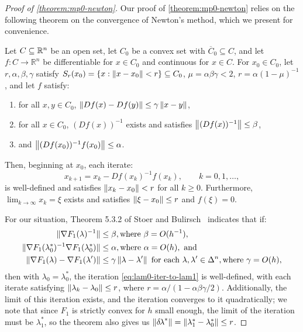\documentclass{article}
\begin{document}
\begin{proof}[Proof of \cref{theorem:mp0-newton}]
  Our proof of \cref{theorem:mp0-newton} relies on the following
  theorem on the convergence of Newton's method, which we present for
  convenience.

  \begin{theorem}\label{thm:stoer-bulirsch}
    Let $C \subseteq \mathbb{R}^n$ be an open set, let $C_0$ be a convex set
    with $\overline{C}_0 \subseteq C$, and let
    $f : C \to \mathbb{R}^n$ be differentiable for $x \in C_0$ and
    continuous for $x \in C$. For $x_0 \in C_0$, let
    $r, \alpha, \beta, \gamma$ satisfy
    $S_r(x_0) = \left\{x : \left\|x - x_0\right\| < r\right\} \subseteq C_0$,
    $\mu = \alpha\beta\gamma < 2$, $r = \alpha(1 - \mu)^{-1}$, and let
    $f$ satisfy:
    \begin{enumerate}[label=(\alph*)]
    \item for all $x, y \in C_0$,
      $\left\|D f(x) - D f(y)\right\| \leq \gamma \left\|x - y\right\|$,
    \item for all $x \in C_0$, $(D f(x))^{-1}$ exists and satisfies
      $\left\|(Df(x))^{-1}\right\| \leq \beta$,
    \item and $\left\|(Df(x_0))^{-1} f(x_0)\right\| \leq \alpha$.
    \end{enumerate}
    Then, beginning at $x_0$, each iterate:
    \begin{equation}
      x_{k+1} = x_k - Df(x_k)^{-1} f(x_k), \qquad k = 0, 1, \hdots,
    \end{equation}
    is well-defined and satisfies $\left\|x_k - x_0\right\| < r$ for all
    $k \geq 0$. Furthermore, $\lim_{k \to \infty} x_k = \xi$ exists and
    satisfies $\left\|\xi - x_0\right\| \leq r$ and $f(\xi) = 0$.
  \end{theorem}

  For our situation, Theorem 5.3.2 of Stoer and
  Bulirsch~\cite{stoer2013introduction} indicates that if:
  \begin{align}
    \|\nabla F_1(\lambda)^{-1}\| &\leq \beta, \mbox{where } \beta = O(h^{-1}) \label{item:sb-newton-1}, \\
    \|\nabla F_1(\lambda_0^*)^{-1} \nabla F_1(\lambda_0^*)\| &\leq \alpha, \mbox{where } \alpha = O(h), \label{item:sb-newton-2} \mbox{ and} \\
    \|\nabla F_1(\lambda) - \nabla F_1(\lambda')\| &\leq \gamma \left\|\lambda - \lambda'\right\| \mbox{ for each } \lambda, \lambda' \in \Delta^n, \mbox{where } \gamma = O(h), \label{item:sb-newton-3}
  \end{align}
  then with $\lambda_0 = \lambda_0^*$, the iteration
  \cref{eq:lam0-iter-to-lam1} is well-defined, with each iterate
  satisfying $\left\|\lambda_k - \lambda_0\right\| \leq r$, where
  $r = \alpha/(1 - \alpha\beta\gamma/2)$. Additionally, the limit of
  this iteration exists, and the iteration converges to it
  quadratically; we note that since $F_1$ is strictly convex for $h$
  small enough, the limit of the iteration must be $\lambda_1^*$, so
  the theorem also gives us
  $\left\|{\delta \hspace{-0.1em} \lambda}^*\right\| = \left\|\lambda_1^* - \lambda_0^*\right\| \leq r$.


\end{proof}
\end{document}
